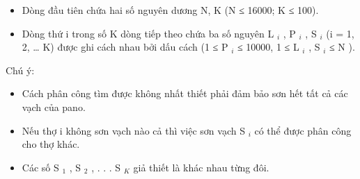 \begin{itemize}
	\item     Dòng đầu tiên chứa hai số nguyên dương N, K (N ≤ 16000; K ≤ 100).   
	\item     Dòng thứ i trong số K dòng tiếp theo chứa ba số nguyên  L    $_     i    $    , P    $_     i    $    , S    $_     i    $    (i = 1, 2, … K) được ghi cách nhau bởi dấu cách (1 ≤  P    $_     i    $    ≤ 10000, 1 ≤   L    $_     i    $    , S    $_     i    $    ≤  N ).   
\end{itemize}

   Chú ý:  
\begin{itemize}
	\item     Cách phân công tìm được không nhất thiết phải đảm bảo sơn hết tất cả các vạch của pano.   
	\item     Nếu thợ i không sơn vạch nào cả thì việc sơn vạch S    $_     i    $    có thể được phân công cho thợ khác.   
	\item     Các số S    $_     1    $    , S    $_     2    $    , . . . S    $_     K    $    giả thiết là khác nhau từng đôi.   
\end{itemize}

\